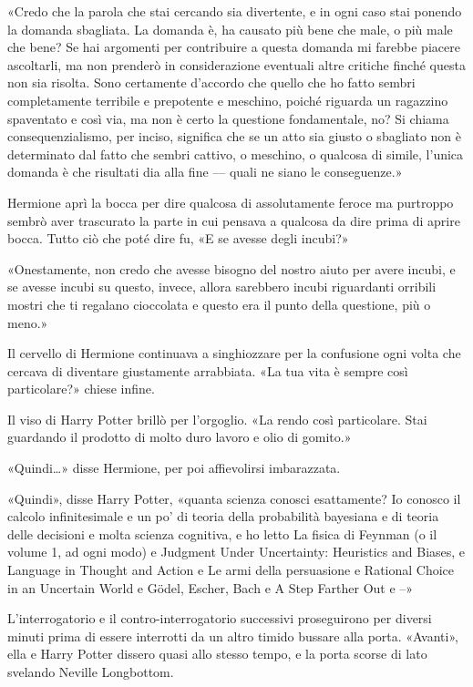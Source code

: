 «Credo che la parola che stai cercando sia divertente, e in ogni caso stai ponendo la domanda sbagliata. La domanda è, ha causato più bene che male, o più male che bene? Se hai argomenti per contribuire a questa domanda mi farebbe piacere ascoltarli, ma non prenderò in considerazione eventuali altre critiche finché questa non sia risolta. Sono certamente d’accordo che quello che ho fatto sembri completamente terribile e prepotente e meschino, poiché riguarda un ragazzino spaventato e così via, ma non è certo la questione fondamentale, no? Si chiama consequenzialismo, per inciso, significa che se un atto sia giusto o sbagliato non è determinato dal fatto che sembri cattivo, o meschino, o qualcosa di simile, l’unica domanda è che risultati dia alla fine — quali ne siano le conseguenze.»

Hermione aprì la bocca per dire qualcosa di assolutamente feroce ma purtroppo sembrò aver trascurato la parte in cui pensava a qualcosa da dire prima di aprire bocca. Tutto ciò che poté dire fu, «E se avesse degli incubi?»

«Onestamente, non credo che avesse bisogno del nostro aiuto per avere incubi, e se avesse incubi su questo, invece, allora sarebbero incubi riguardanti orribili mostri che ti regalano cioccolata e questo era il punto della questione, più o meno.»

Il cervello di Hermione continuava a singhiozzare per la confusione ogni volta che cercava di diventare giustamente arrabbiata. «La tua vita è sempre così particolare?» chiese infine.

Il viso di Harry Potter brillò per l’orgoglio. «La rendo così particolare. Stai guardando il prodotto di molto duro lavoro e olio di gomito.»

«Quindi…» disse Hermione, per poi affievolirsi imbarazzata.

«Quindi», disse Harry Potter, «quanta scienza conosci esattamente? Io conosco il calcolo infinitesimale e un po’ di teoria della probabilità bayesiana e di teoria delle decisioni e molta scienza cognitiva, e ho letto La fisica di Feynman (o il volume 1, ad ogni modo) e Judgment Under Uncertainty: Heuristics and Biases, e Language in Thought and Action e Le armi della persuasione e Rational Choice in an Uncertain World e Gödel, Escher, Bach e A Step Farther Out e –»

L’interrogatorio e il contro-interrogatorio successivi proseguirono per diversi minuti prima di essere interrotti da un altro timido bussare alla porta. «Avanti», ella e Harry Potter dissero quasi allo stesso tempo, e la porta scorse di lato svelando Neville Longbottom.

